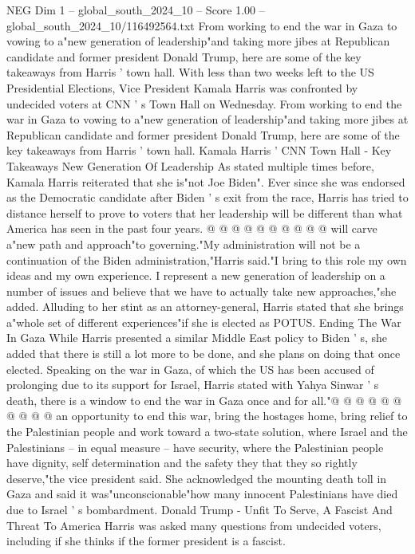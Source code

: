 \begin{textsample}{NEG Dim 1 – global\_south\_2024\_10 – Score 1.00 – global\_south\_2024\_10/116492564.txt}  \label{ex:f1_neg_282}
From working to end the war in Gaza to vowing to a"new generation of leadership"and taking more jibes at Republican candidate and former president Donald Trump, here are some of the key takeaways from Harris ' town hall.
With less than two weeks left to the US Presidential Elections, Vice President Kamala Harris was confronted by undecided voters at CNN ' s Town Hall on Wednesday.
From working to end the war in Gaza to vowing to a"new generation of leadership"and taking more jibes at Republican candidate and former president Donald Trump, here are some of the key takeaways from Harris ' town hall.
Kamala Harris ' CNN Town Hall - Key Takeaways New Generation Of Leadership As stated multiple times before, Kamala Harris reiterated that she is"not Joe Biden".
Ever since she was endorsed as the Democratic candidate after Biden ' s exit from the race, Harris has tried to distance herself to prove to voters that her leadership will be different than what America has seen in the past four years. @ @ @ @ @ @ @ @ @ @ will carve a"new path and approach"to governing."My administration will not be a continuation of the Biden administration,"Harris said."I bring to this role my own ideas and my own experience.
I represent a new generation of leadership on a number of issues and believe that we have to actually take new approaches,"she added.
Alluding to her stint as an attorney-general, Harris stated that she brings a"whole set of different experiences"if she is elected as POTUS.
Ending The War In Gaza While Harris presented a similar Middle East policy to Biden ' s, she added that there is still a lot more to be done, and she plans on doing that once elected.
Speaking on the war in Gaza, of which the US has been accused of prolonging due to its support for Israel, Harris stated with Yahya Sinwar ' s death, there is a window to end the war in Gaza once and for all."@ @ @ @ @ @ @ @ @ @ an opportunity to end this war, bring the hostages home, bring relief to the Palestinian people and work toward a two-state solution, where Israel and the Palestinians -- in equal measure -- have security, where the Palestinian people have dignity, self determination and the safety they that they so rightly deserve,"the vice president said.
She acknowledged the mounting death toll in Gaza and said it was"unconscionable"how many innocent Palestinians have died due to Israel ' s bombardment.
Donald Trump - Unfit To Serve, A Fascist And Threat To America Harris was asked many questions from undecided voters, including if she thinks if the former president is a fascist.

\end{textsample}
